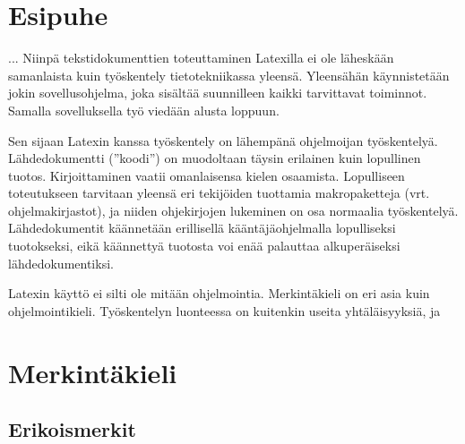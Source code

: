 \documentclass[notitlepage,oneside]{book}
\begin{document}
\pagestyle{empty}


{
  \renewcommand{\thispagestyle}[1]{}
}

\clearpage
\pagestyle{plain}

\chapter*{Esipuhe}


... Niinpä tekstidokumenttien toteuttaminen Latexilla ei ole läheskään
samanlaista kuin työskentely tietotekniikassa yleensä. Yleensähän
käynnistetään jokin sovellus\-ohjelma, joka sisältää suunnilleen kaikki
tarvittavat toiminnot. Samalla sovelluksella työ viedään alusta loppuun.

Sen sijaan Latexin kanssa työskentely on lähempänä ohjelmoijan
työskentelyä. Lähdedokumentti (''koodi'') on muodoltaan täysin erilainen
kuin lopullinen tuotos. Kirjoittaminen vaatii omanlaisensa kielen
osaamista. Lopulliseen toteutukseen tarvitaan yleensä eri tekijöiden
tuottamia makropaketteja (vrt. ohjelmakirjastot), ja niiden ohjekirjojen
lukeminen on osa normaalia työskentelyä. Lähdedokumentit käännetään
erillisellä kääntäjäohjelmalla lopulliseksi tuotokseksi, eikä käännettyä
tuotosta voi enää palauttaa alkuperäiseksi lähdedokumentiksi.

Latexin käyttö ei silti ole mitään ohjelmointia. Merkintäkieli on eri
asia kuin ohjelmointikieli. Työskentelyn luonteessa on kuitenkin useita
yhtäläisyyksiä, ja 



\chapter{Merkintäkieli}
\section{Erikoismerkit}
\end{document}
